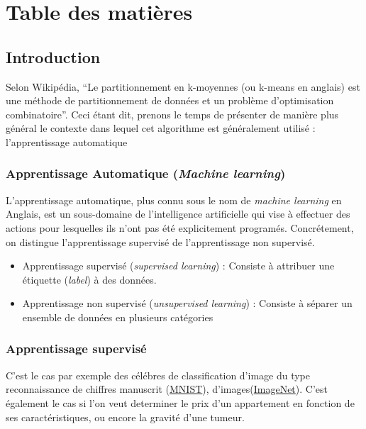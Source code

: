 \documentclass[letterpaper,10pt,english]{sphinxmanual}
\begin{document}
\chapter{Table des matières}
\label{index:table-des-matieres}\label{index:documentation-du-projet-k-means}

\section{Introduction}
\label{introduction:introduction}\label{introduction::doc}
Selon Wikipédia, ``Le partitionnement en k-moyennes (ou k-means en anglais) est une méthode de partitionnement de données et un problème d'optimisation combinatoire''. Ceci étant dit, prenons le temps de présenter de manière plus général le contexte dans lequel cet algorithme est généralement utilisé : l'apprentissage automatique


\subsection{Apprentissage Automatique (\emph{Machine learning})}
\label{introduction:apprentissage-automatique-machine-learning}
L'apprentissage automatique, plus connu sous le nom de \emph{machine learning} en Anglais, est un sous-domaine de l'intelligence artificielle qui vise à effectuer des actions pour lesquelles ils n'ont pas été explicitement programés. Concrétement, on distingue l'apprentissage supervisé de l'apprentissage non supervisé.
\begin{itemize}
\item {} 
Apprentissage supervisé (\emph{supervised learning}) : Consiste à attribuer une étiquette (\emph{label}) à des données.

\item {} 
Apprentissage non supervisé (\emph{unsupervised learning}) : Consiste à séparer un ensemble de données en plusieurs catégories

\end{itemize}


\subsection{Apprentissage supervisé}
\label{introduction:apprentissage-supervise}
C'est le cas par exemple des célébres de classification d'image du type reconnaissance de chiffres manuscrit (\href{http://yann.lecun.com/exdb/mnist/index.html}{MNIST}), d'images(\href{http://www.image-net.org/}{ImageNet}). C'est également le cas si l'on veut determiner le prix d'un appartement en fonction de ses caractéristiques, ou encore la gravité d'une tumeur.
\end{document}

